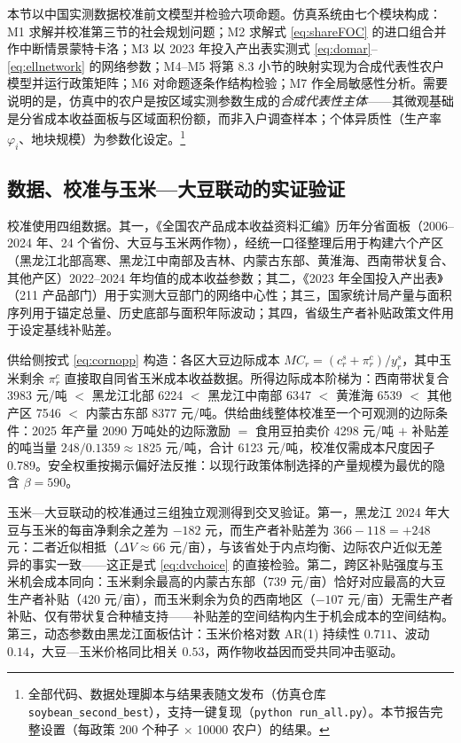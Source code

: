 \documentclass[UTF8,zihao=-4,fontset=fandol]{ctexart}
\numberwithin{equation}{section}
\theoremstyle{definition}
\theoremstyle{remark}
\begin{document}
本节以中国实测数据校准前文模型并检验六项命题。仿真系统由七个模块构成：M1 求解并校准第三节的社会规划问题；M2 求解式 \eqref{eq:shareFOC} 的进口组合并作中断情景蒙特卡洛；M3 以 2023 年投入产出表实测式 \eqref{eq:domar}--\eqref{eq:ellnetwork} 的网络参数；M4--M5 将第 8.3 小节的映射实现为合成代表性农户模型并运行政策矩阵；M6 对命题逐条作结构检验；M7 作全局敏感性分析。需要说明的是，仿真中的农户是按区域实测参数生成的\emph{合成代表性主体}——其微观基础是分省成本收益面板与区域面积份额，而非入户调查样本；个体异质性（生产率 $\varphi_i$、地块规模）为参数化设定。\footnote{全部代码、数据处理脚本与结果表随文发布（仿真仓库 \texttt{soybean\_second\_best}），支持一键复现（\texttt{python run\_all.py}）。本节报告完整设置（每政策 200 个种子 $\times$ 10000 农户）的结果。}

\subsection{数据、校准与玉米—大豆联动的实证验证}

校准使用四组数据。其一，《全国农产品成本收益资料汇编》历年分省面板（2006--2024 年、24 个省份、大豆与玉米两作物），经统一口径整理后用于构建六个产区（黑龙江北部高寒、黑龙江中南部及吉林、内蒙古东部、黄淮海、西南带状复合、其他产区）2022--2024 年均值的成本收益参数；其二，《2023 年全国投入产出表》（211 产品部门）用于实测大豆部门的网络中心性；其三，国家统计局产量与面积序列用于锚定总量、历史底部与面积年际波动；其四，省级生产者补贴政策文件用于设定基线补贴差。

供给侧按式 \eqref{eq:cornopp} 构造：各区大豆边际成本 $MC_r=(c_r^s+\pi_r^c)/y_r^s$，其中玉米剩余 $\pi_r^c$ 直接取自同省玉米成本收益数据。所得边际成本阶梯为：西南带状复合 3983 元/吨 $<$ 黑龙江北部 6224 $<$ 黑龙江中南部 6347 $<$ 黄淮海 6539 $<$ 其他产区 7546 $<$ 内蒙古东部 8377 元/吨。供给曲线整体校准至一个可观测的边际条件：2025 年产量 2090 万吨处的边际激励 $=$ 食用豆拍卖价 4298 元/吨 $+$ 补贴差的吨当量 $248/0.1359\approx1825$ 元/吨，合计 6123 元/吨，校准仅需成本尺度因子 0.789。安全权重按揭示偏好法反推：以现行政策体制选择的产量规模为最优的隐含 $\beta=590$。

玉米—大豆联动的校准通过三组独立观测得到交叉验证。第一，黑龙江 2024 年大豆与玉米的每亩净剩余之差为 $-182$ 元，而生产者补贴差为 $366-118=+248$ 元：二者近似相抵（$\Delta V\approx 66$ 元/亩），与该省处于内点均衡、边际农户近似无差异的事实一致——这正是式 \eqref{eq:dvchoice} 的直接检验。第二，跨区补贴强度与玉米机会成本同向：玉米剩余最高的内蒙古东部（739 元/亩）恰好对应最高的大豆生产者补贴（420 元/亩），而玉米剩余为负的西南地区（$-107$ 元/亩）无需生产者补贴、仅有带状复合种植支持——补贴差的空间结构内生于机会成本的空间结构。第三，动态参数由黑龙江面板估计：玉米价格对数 AR(1) 持续性 $0.711$、波动 $0.14$，大豆—玉米价格同比相关 $0.53$，两作物收益因而受共同冲击驱动。
\end{document}
